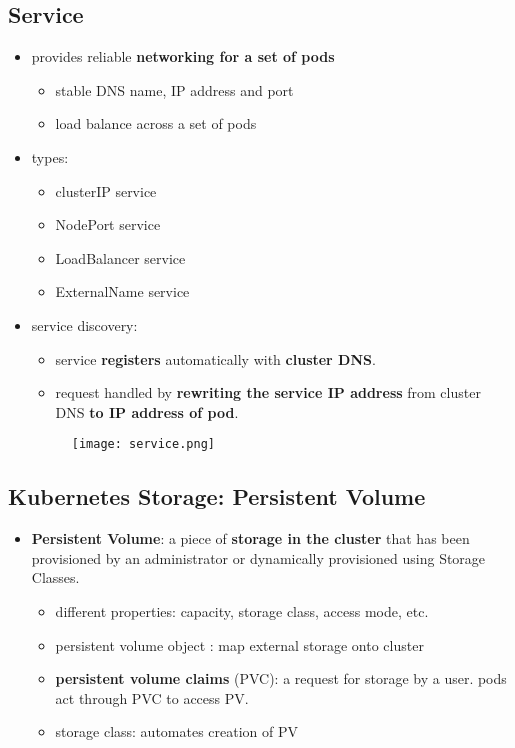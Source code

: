 \subsection{Service}
\begin{itemize}
	\item provides reliable \textbf{networking for a set of pods}
	\begin{itemize}
		\item stable DNS name, IP address and port 
		\item load balance across a set of pods
	\end{itemize}
	\item types:
	\begin{itemize}
		\item clusterIP service
		\item NodePort service
		\item LoadBalancer service
		\item ExternalName service
	\end{itemize}
	\item service discovery: 
	\begin{itemize}
		\item service \textbf{registers} automatically with \textbf{cluster DNS}. 
		\item request handled by \textbf{rewriting the service IP address} from cluster DNS \textbf{to IP address of pod}.
	\end{itemize}
	
	\begin{figure}[H]
		\centering
		\texttt{[image: service.png]}
	\end{figure}
\end{itemize}


\subsection{Kubernetes Storage: Persistent Volume}
\begin{itemize}
	\item \textbf{Persistent Volume}: a piece of \textbf{storage in the cluster} that has been provisioned by an administrator or dynamically provisioned using Storage Classes.
	\begin{itemize}
		\item different properties: capacity, storage class, access mode, etc.
		\item persistent volume object : map external storage onto cluster
		\item \textbf{persistent volume claims} (PVC): a request for storage by a user. pods act through PVC to access PV.
		\item storage class: automates creation of PV
	\end{itemize}
\end{itemize}

